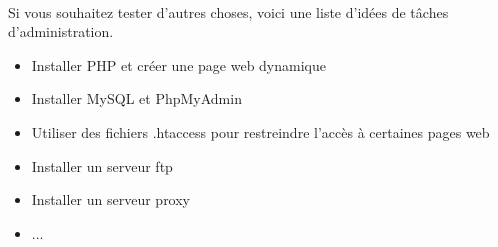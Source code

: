\documentclass[12pt,a4paper]{article}
\begin{document}
\paragraph{}
Si vous souhaitez tester d'autres choses, voici une liste d'idées de tâches d'administration.
\begin{itemize}
\item Installer PHP et créer une page web dynamique
\item Installer MySQL et PhpMyAdmin
\item Utiliser des fichiers .htaccess pour restreindre l'accès à certaines pages web
\item Installer un serveur ftp
\item Installer un serveur proxy
\item ...
\end{itemize}
\end{document}
